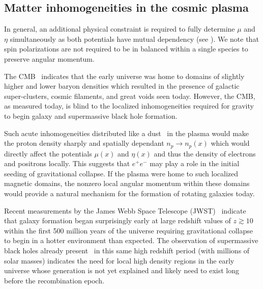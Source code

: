 \subsection{Matter inhomogeneities in the cosmic plasma}
\label{sec:inhomogeneous}
\noindent In general, an additional physical constraint is required to fully determine $\mu$ and $\eta$ simultaneously as both potentials have mutual dependency (see ). We note that spin polarizations are not required to be in balanced within a single species to preserve angular momentum.

The CMB~\cite{Planck:2018vyg} indicates that the early universe was home to domains of slightly higher and lower baryon densities which resulted in the presence of galactic super-clusters, cosmic filaments, and great voids seen today. However, the CMB, as measured today, is blind to the localized inhomogeneities required for gravity to begin galaxy and supermassive black hole formation.

Such acute inhomogeneities distributed like a dust~\cite{Grayson:2023flr} in the plasma would make the proton density sharply and spatially dependant $n_{p}\rightarrow n_{p}(x)$ which would directly affect the potentials $\mu(x)$ and $\eta(x)$ and thus the density of electrons and positrons locally. This suggests that $e^{+}e^{-}$ may play a role in the initial seeding of gravitational collapse. If the plasma were home to such localized magnetic domains, the nonzero local angular momentum within these domains would provide a natural mechanism for the formation of rotating galaxies today.

Recent measurements by the James Webb Space Telescope (JWST)~\cite{Yan:2022sxd,adams2023discovery,arrabal2023spectroscopic} indicate that galaxy formation began surprisingly early at large redshift values of $z\gtrsim10$ within the first 500 million years of the universe requiring gravitational collapse to begin in a hotter environment than expected. The observation of supermassive black holes already present~\cite{CEERSTeam:2023qgy} in this same high redshift period (with millions of solar masses) indicates the need for local high density regions in the early universe whose generation is not yet explained and likely need to exist long before the recombination epoch.
